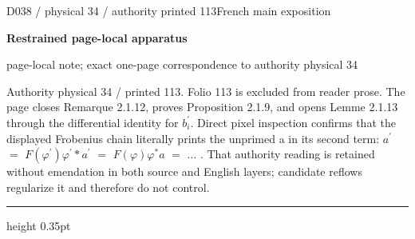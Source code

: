 \documentclass[9pt]{article}
\newcommand{\CanonText}[1]{\par{\fontsize{8.0}{9.35}\selectfont\RaggedRight #1\par}\vspace{2.2pt}}
\newcommand{\LayerTitle}{Restrained page-local apparatus}
\begin{document}
\noindent\begin{minipage}[t][\dimexpr\textheight-5pt\relax][t]{\textwidth}
{\sffamily\fontsize{7.3}{8.2}\selectfont\color{Quiet} D038 / physical 34 / authority printed 113\hfill French main exposition}
\par{}\vspace{4.5pt}
{\sffamily\fontsize{10.4}{11.6}\selectfont\bfseries\color{Accent} \LayerTitle}
\par{\sffamily\fontsize{6.7}{7.7}\selectfont\color{Quiet} page-local note; exact one-page correspondence to authority physical 34}
\vspace{5pt}
\CanonText{Authority physical 34 / printed 113. Folio 113 is excluded from reader prose. The page closes Remarque 2.1.12, proves Proposition 2.1.9, and opens Lemme 2.1.13 through the differential identity for \(b^{\prime}_{i}\). Direct pixel inspection confirms that the displayed Frobenius chain literally prints the unprimed a in its second term: \(a^{\prime}\) \(=\) \(F(\varphi{}^{\prime})\varphi{}^{\prime}*a^{\prime}\) \(=\) \(F(\varphi{})\varphi{}^{*}a\) \(=\) \(\ldots{}\) . That authority reading is retained without emendation in both source and English layers; candidate reflows regularize it and therefore do not control.}
\vfill
{\color{Accent}\hrule height 0.35pt}\vspace{3pt}
\end{minipage}
\newpage
\end{document}
